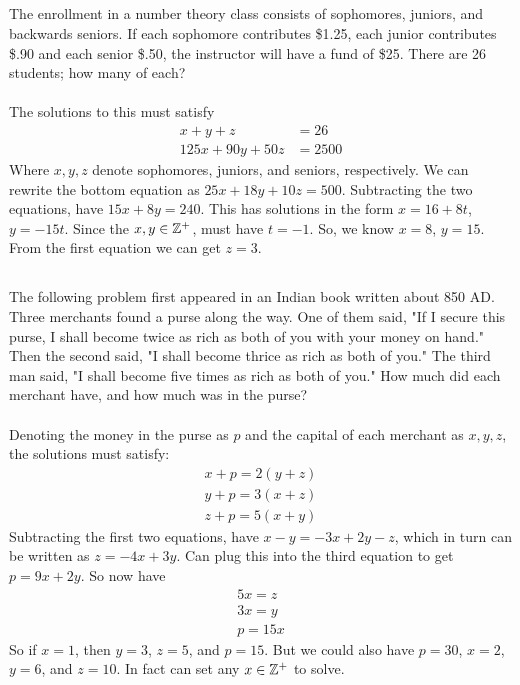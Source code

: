 \documentclass{article}
\begin{document}
\subsection{}
The enrollment in a number theory class consists of sophomores, juniors, and
backwards seniors. If each sophomore contributes \$1.25, each junior contributes
\$.90 and each senior \$.50, the instructor will have a fund of \$25.
There are 26 students; how many of each?\\~\\
The solutions to this must satisfy
\begin{align}
    x + y + z &= 26\\
    125x + 90y + 50z &= 2500
\end{align}
Where $x, y, z$ denote sophomores, juniors, and seniors, respectively.
We can rewrite the bottom equation as $25x + 18y + 10z = 500$.
Subtracting the two equations, have $15x + 8y = 240$.
This has solutions in the form $x = 16 + 8t$, $y = -15t$.
Since the $x, y \in \mathbb{Z}^+$, must have $t = -1$.
So, we know $x = 8$, $y = 15$.
From the first equation we can get $z = 3$.

\subsection{}
The following problem first appeared in an Indian book written about 850 AD.
Three merchants found a purse along the way. One of them said, "If I secure
this purse, I shall become twice as rich as both of you with your money on
hand." Then the second said, "I shall become thrice as rich as both of you."
The third man said, "I shall become five times as rich as both of you."
How much did each merchant have, and how much was in the purse?\\~\\
Denoting the money in the purse as $p$ and the capital of each merchant
as $x, y, z$, the solutions must satisfy:
\begin{align}
    x + p = 2(y + z)\\
    y + p = 3(x + z)\\
    z + p = 5(x + y)
\end{align}
Subtracting the first two equations, have $x - y = -3x + 2y - z$,
which in turn can be written as $z = -4x + 3y$.
Can plug this into the third equation to get $p = 9x + 2y$.
So now have
\begin{align}
    5x = z\\
    3x = y\\
    p = 15x
\end{align}
So if $x = 1$, then $y = 3$, $z = 5$, and $p = 15$.
But we could also have $p = 30$, $x = 2$, $y = 6$, and $z = 10$.
In fact can set any $x \in \mathbb{Z}^+$ to solve.
\end{document}
